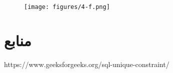 \documentclass{article}
\begin{document}
\subsection{}
\begin{figure}[ht]
    \centering
    \texttt{[image: figures/4-f.png]}
    \caption
	{
	}
    \label{fig:fig1}
\end{figure}

\section{}
\subsection{}


\section*{منابع}
\renewcommand{\section}[2]{}%
\begin{thebibliography}{99} %


\begin{LTRitems}

\resetlatinfont

 https://www.geeksforgeeks.org/sql-unique-constraint/
\end{LTRitems}

\end{thebibliography}
\end{document}
